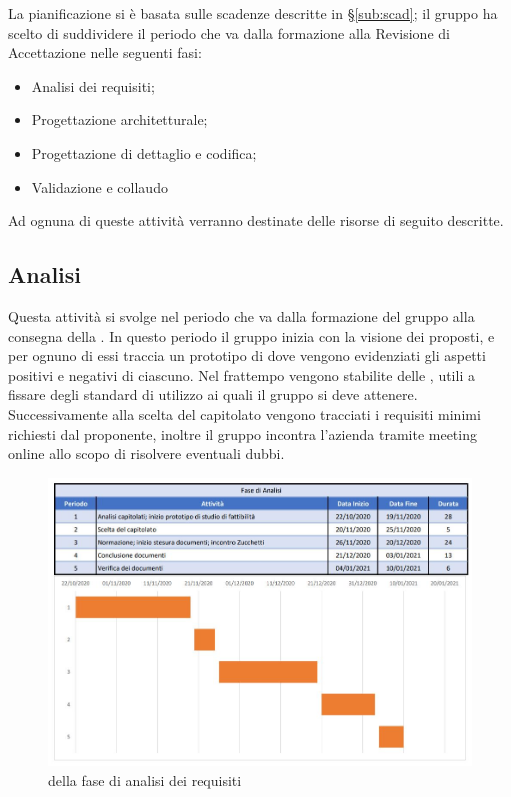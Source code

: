\documentclass[../piano_di_progetto.tex]{subfiles}
\begin{document}
La pianificazione si è basata sulle scadenze descritte in \S\ref{sub:scad}; il gruppo ha scelto di suddividere il periodo che va dalla formazione alla Revisione di Accettazione nelle seguenti fasi:
\begin{itemize}
\item Analisi dei requisiti;
\item Progettazione architetturale;
\item Progettazione di dettaglio e codifica;
\item Validazione e collaudo
\end{itemize}
Ad ognuna di queste attività verranno destinate delle risorse di seguito descritte.


\subsection{Analisi}%
\label{sub:analisi}
Questa attività si svolge nel periodo che va dalla formazione del gruppo alla consegna della . In questo periodo il gruppo inizia con la visione dei  proposti, e per ognuno di essi traccia un prototipo di  dove vengono evidenziati gli aspetti positivi e negativi di ciascuno. Nel frattempo vengono stabilite delle , utili a fissare degli standard di utilizzo ai quali il gruppo si deve attenere. Successivamente alla scelta del capitolato vengono tracciati i requisiti minimi richiesti dal proponente, inoltre il gruppo incontra l’azienda tramite meeting online allo scopo di risolvere eventuali dubbi.\\

\begin{figure}[H]
\centering

\includegraphics[width=12cm]{componenti/img/fase_analisi}
\caption{  della fase di analisi dei requisiti}

\end{figure}
\end{document}
